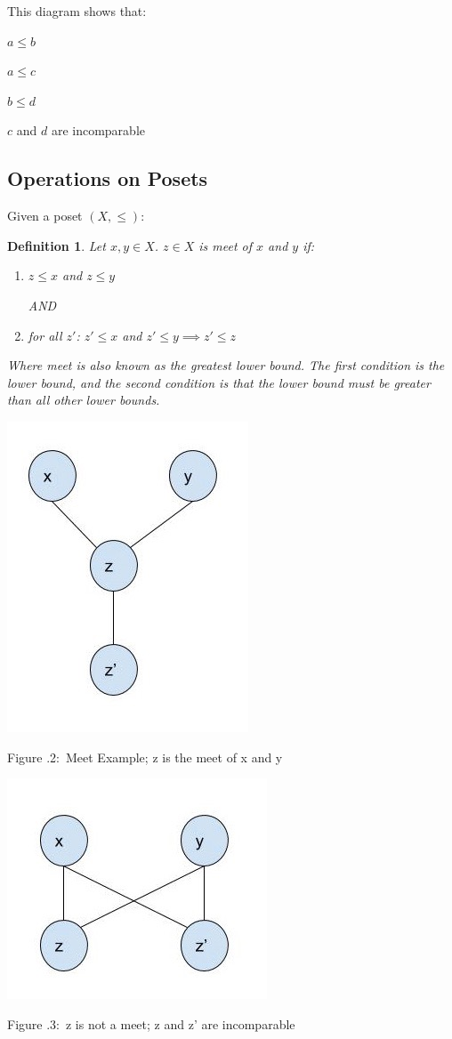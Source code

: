 \documentclass[twoside]{article}
\newcounter{lecnum}
\newcommand{\fig}[3]{
			\vspace{#2}
			\begin{center}
			Figure \thelecnum.#1:~#3
			\end{center}
	}
\newtheorem{definition}[theorem]{Definition}
\begin{document}
This diagram shows that:

$a \leq b$

$a \leq c$

$b \leq d$

$c$ and $d$ are incomparable

\subsection{Operations on Posets}
Given a poset $(X, \leq)$:


\begin{definition}
Let $x,y \in X$. $z \in X$ is meet of $x$ and $y$ if:
\begin{enumerate}
    \item $z \leq x$ and $z \leq y$    
    
    AND
    \item for all $z'$: $z' \leq x$ and $z' \leq y \implies z' \leq z$
\end{enumerate}

Where meet is also known as the greatest lower bound. The first condition is the lower bound, and the second condition is that the lower bound must be greater than all other lower bounds.
\end{definition} 

\begin{minipage}[]{\textwidth}
\centering
\includegraphics[width=.5\textwidth]{meet.jpg}
\end{minipage}
\fig{2}{0cm}{Meet Example; z is the meet of x and y}

\begin{minipage}[]{\textwidth}
\centering
\includegraphics[width=.5\textwidth]{incomparable.jpg}
\end{minipage}
\fig{3}{0cm}{z is not a meet; z and z' are incomparable}
\end{document}
